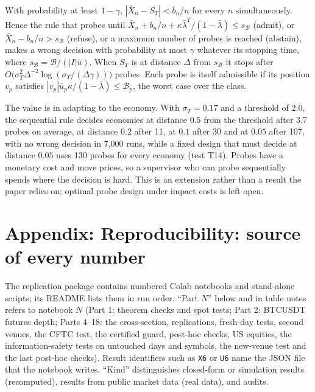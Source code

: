 \begin{proposition}\label{p2:prop:probe}
With probability at least $1-\gamma$, $|\bar X_n-S_T|<b_n/n$ for every $n$ simultaneously. Hence the rule that probes until $\bar X_n+b_n/n+\kappa\bar\lambda^T/(1-\bar\lambda)\le s_{\mathcal B}$ (admit), or $\bar X_n-b_n/n>s_{\mathcal B}$ (refuse), or a maximum number of probes is reached (abstain), makes a wrong decision with probability at most $\gamma$ whatever its stopping time, where $s_{\mathcal B}=\mathcal B/(|I|\bar u)$. When $S_T$ is at distance $\Delta$ from $s_{\mathcal B}$ it stops after $O\bigl(\sigma_T^2\Delta^{-2}\log(\sigma_T/(\Delta\gamma))\bigr)$ probes. Each probe is itself admissible if its position $v_p$ satisfies $|v_p|\bar u_p\kappa/(1-\bar\lambda)\le\mathcal B_p$, the worst case over the class.
\end{proposition}

The value is in adapting to the economy. With $\sigma_T=0.17$ and a threshold of $2.0$, the sequential rule decides economies at distance $0.5$ from the threshold after 3.7 probes on average, at distance $0.2$ after 11, at $0.1$ after 30 and at $0.05$ after 107, with no wrong decision in 7{,}000 runs, while a fixed design that must decide at distance $0.05$ uses 130 probes for every economy (test T14). Probes have a monetary cost and move prices, so a supervisor who can probe sequentially spends where the decision is hard. This is an extension rather than a result the paper relies on; optimal probe design under impact costs is left open.

\section{Appendix: Reproducibility: source of every number}\label{p2:app:repro}

The replication package contains numbered Colab notebooks and stand-alone scripts; its README lists them in run order. ``Part $N$'' below and in table notes refers to notebook $N$ (Part 1: theorem checks and spot tests; Part 2: BTCUSDT futures depth; Parts 4--18: the cross-section, replications, fresh-day tests, second venues, the CFTC test, the certified guard, post-hoc checks, US equities, the information-safety tests on untouched days and symbols, the new-venue test and the last post-hoc checks). Result identifiers such as \texttt{X6} or \texttt{U6} name the JSON file that the notebook writes. ``Kind'' distinguishes closed-form or simulation results (recomputed), results from public market data (real data), and audits.

